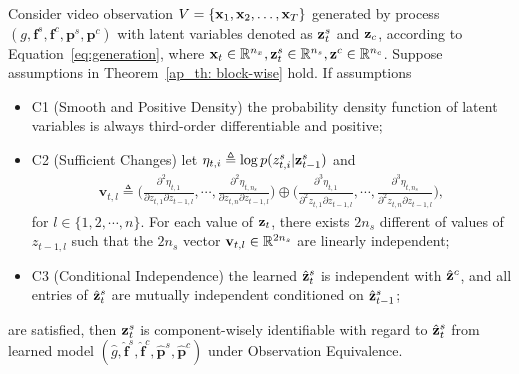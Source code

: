 \begin{theorem}
    \label{ap_th: componenet-wise}
    Consider video observation $V = \{{\mathbf{x}}_1, {\mathbf{x}}_2, \dots, {\mathbf{x}}_T\}$ generated by process $(g, \textbf{f}^s, \textbf{f}^c, \textbf{p}^s, \textbf{p}^c)$ with latent variables denoted as ${\mathbf{z}}_t^s$ and ${\mathbf{z}}_c$, according to Equation~\ref{eq:generation}, where ${\mathbf{x}}_t\in\mathbb{R}^{n_x},{\mathbf{z}}_t^s\in\mathbb{R}^{n_s},{\mathbf{z}}^c\in\mathbb{R}^{n_c}$. Suppose assumptions in Theorem~\ref{ap_th: block-wise} hold. If assumptions 
    \begin{itemize}
        \item C1 (Smooth and Positive Density) the probability density function of latent variables is always third-order differentiable and positive;
        \item C2 (Sufficient Changes) let $\eta_{t,i}\triangleq\log p(z^s_{t,i} | {\mathbf{z}}_{t-1}^s)$ and
        \begin{equation} 
            \label{Eq: assumption sufficient}
            \begin{aligned}
            \mathbf{v}_{t,l} 
            \triangleq \Big(
            \frac{\partial^2 \eta_{t,1}}{\partial z_{t,1} \partial z_{t-1,l}}, 
            \cdots,
            \frac{\partial^2 \eta_{t,n_s}}{\partial z_{t,n} \partial z_{t-1,l}} \Big)
            \oplus
            \Big(
            \frac{\partial^3 \eta_{t,1}}{\partial^2 z_{t,1} \partial z_{t-1,l}}, 
            \cdots,
            \frac{\partial^3 \eta_{t,n_s}}{\partial^2 z_{t,n} \partial z_{t-1,l}} \Big)
            ,
            \end{aligned}
        \end{equation}
        for $l \in\{1,2,\cdots,n\}$. For each value of ${\mathbf{z}}_t$, there exists $ 2n_s$ different of values of $z_{t-1,l}$ such that the $2n_s$ vector ${\mathbf{v}}_{t,l}\in\mathbb{R}^{2n_s}$ are linearly independent;
        \item C3 (Conditional Independence) the learned $\hat{{\mathbf{z}}}_t^s$ is independent with $\hat{{\mathbf{z}}}^c$, and all entries of $\hat{{\mathbf{z}}}_t^s$ are mutually independent conditioned on $\hat{{\mathbf{z}}}_{t-1}^s$;
    \end{itemize}
    are satisfied, then ${\mathbf{z}}_t^s$ is component-wisely identifiable with regard to $\hat{{\mathbf{z}}}_t^s$ from learned model $(\hat{g}, \hat{\textbf{f}}^s, \hat{\textbf{f}}^c, \hat{\textbf{p}}^s, \hat{\textbf{p}}^c)$ under Observation Equivalence.
\end{theorem}

